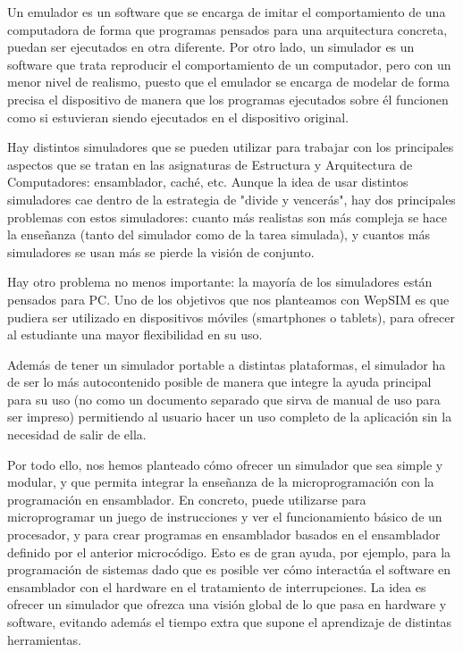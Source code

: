Un emulador es un software que se encarga de imitar el comportamiento de una computadora de forma que programas pensados para una arquitectura concreta, puedan ser ejecutados en otra diferente. Por otro lado, un simulador es un software que trata reproducir el comportamiento de un computador, pero con un menor nivel de realismo, puesto que el emulador se encarga de modelar de forma precisa el dispositivo de manera que los programas ejecutados sobre él funcionen como si estuvieran siendo ejecutados en el dispositivo original.

Hay distintos simuladores que se pueden utilizar para trabajar con los principales aspectos que se tratan en las asignaturas de Estructura y Arquitectura de Computadores: ensamblador, caché, etc. Aunque la idea de usar distintos simuladores cae dentro de la estrategia de "divide y vencerás", hay dos principales problemas con estos simuladores: cuanto más realistas son más compleja se hace la enseñanza (tanto del simulador como de la tarea simulada), y cuantos más simuladores se usan más se pierde la visión de conjunto.

Hay otro problema no menos importante: la mayoría de los simuladores están pensados para PC. Uno de los objetivos que nos planteamos con WepSIM es que pudiera ser utilizado en dispositivos móviles (smartphones o tablets), para ofrecer al estudiante una mayor flexibilidad en su uso.

Además de tener un simulador portable a distintas plataformas, el simulador ha de ser lo más autocontenido posible de manera que integre la ayuda principal para su uso (no como un documento separado que sirva de manual de uso para ser impreso) permitiendo al usuario hacer un uso completo de la aplicación sin la necesidad de salir de ella.

Por todo ello, nos hemos planteado cómo ofrecer un simulador que sea simple y modular, y que permita integrar la enseñanza de la microprogramación con la programación en ensamblador. En concreto, puede utilizarse para microprogramar un juego de instrucciones y ver el funcionamiento básico de un procesador, y para crear programas en ensamblador basados en el ensamblador definido por el anterior microcódigo. Esto es de gran ayuda, por ejemplo, para la programación de sistemas dado que es posible ver cómo interactúa el software en ensamblador con el hardware en el tratamiento de interrupciones. La idea es ofrecer un simulador que ofrezca una visión global de lo que pasa en hardware y software, evitando además el tiempo extra que supone el aprendizaje de distintas herramientas.


